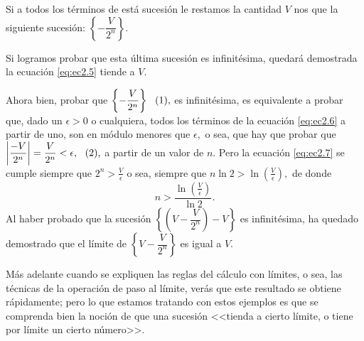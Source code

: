 \documentclass[oneside,english,spanish,2m,twoside,svgnames,x11names,HTML,twoside,12pt]{libro-matua}\usepackage[]{graphicx}\usepackage[]{color}
\newcommand{\val}[1]{\left|#1\right|}
\newcommand{\inline}{\refstepcounter{equation}~~\mbox{(\theequation)}}%
\begin{document}
Si a todos los términos de está sucesión le restamos la cantidad $V$
nos que la siguiente sucesión: $\left\{ -\dfrac{V}{2^{n}}\right\} .$

Si logramos probar que esta última sucesión es infinitésima, quedará
demostrada la ecuación \ref{eq:ec2.5} tiende a $V$.

Ahora bien, probar que $\left\{ -\dfrac{V}{2^{n}}\right\} \inline\text{\label{eq:ec2.6}},$
es infinitésima, es equivalente a probar que, dado un $\epsilon>0$
o cualquiera, todos los términos de la ecuación \ref{eq:ec2.6} a
partir de uno, son en módulo menores que $\epsilon,$ o sea, que hay
que probar que $\val{\dfrac{-V}{2^{n}}}=\dfrac{V}{2^{n}}<\epsilon,\text{\inline\text{\label{eq:ec2.7}},}$
a partir de un valor de $n.$ Pero la ecuación \ref{eq:ec2.7} se
cumple siempre que $2^{n}>\frac{V}{\epsilon}$ o sea, siempre que
$n\ln2>\ln\left(\frac{V}{\epsilon}\right),$ de donde 
\[
n>\dfrac{\ln\left(\frac{V}{\epsilon}\right)}{\ln2}.
\]
Al haber probado que la sucesión $\left\{ \left(V-\dfrac{V}{2^{n}}\right)-V\right\} $
es infinitésima, ha quedado demostrado que el límite de $\left\{ V-\dfrac{V}{2^{n}}\right\} $
es igual a $V$. \fin

Más adelante cuando se expliquen las reglas del cálculo con límites,
o sea, las técnicas de la operación de paso al límite, verás que este
resultado se obtiene rápidamente; pero lo que estamos tratando con
estos ejemplos es que se comprenda bien la noción de que una sucesión
<<tienda a cierto límite, o tiene por límite un cierto número>>.
\end{document}
